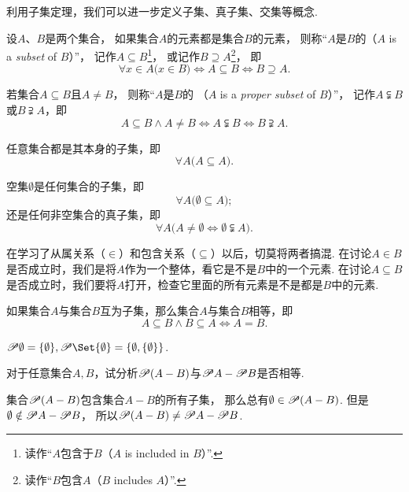 利用子集定理，我们可以进一步定义子集、真子集、交集等概念.
\begin{definition}
设\(A\)、\(B\)是两个集合，
如果集合\(A\)的元素都是集合\(B\)的元素，
则称“\(A\)是\(B\)的（\(A\) is a \emph{subset} of \(B\)）”，
记作\(A \subseteq B\)\footnote{读作“\(A\)包含于\(B\)（\(A\) is included in \(B\)）”.}，
或记作\(B \supseteq A\)\footnote{读作“\(B\)包含\(A\)（\(B\) includes \(A\)）”.}，
即\[
	\forall x \in A \bigl( x \in B \bigr)
	\iff A \subseteq B
	\iff B \supseteq A.
\]

若集合\(A \subseteq B\)且\(A \neq B\)，
则称“\(A\)是\(B\)的%
（\(A\) is a \emph{proper subset} of \(B\)）”，
记作\(A \subsetneqq B\)或\(B \supsetneqq A\)，即\[
	A \subseteq B
	\land
	A \neq B
	\iff
	A \subsetneqq B
	\iff
	B \supsetneqq A.
\]
\end{definition}

\begin{theorem}
任意集合都是其本身的子集，即\[
	\forall A \bigl( A \subseteq A \bigr).
\]
\end{theorem}

\begin{theorem}
空集\(\emptyset\)是任何集合的子集，即\[
	\forall A \bigl( \emptyset \subseteq A \bigr);
\]还是任何非空集合的真子集，即\[
	\forall A \bigl( A \neq \emptyset \iff \emptyset \subsetneqq A \bigr).
\]
\end{theorem}

在学习了从属关系（\(\in\)）和包含关系（\(\subseteq\)）以后，切莫将两者搞混.
在讨论\(A \in B\)是否成立时，我们是将\(A\)作为一个整体，看它是不是\(B\)中的一个元素.
在讨论\(A \subseteq B\)是否成立时，我们要将\(A\)打开，检查它里面的所有元素是不是都是\(B\)中的元素.

\begin{theorem}
如果集合\(A\)与集合\(B\)互为子集，那么集合\(A\)与集合\(B\)相等，即\[
	A \subseteq B \land B \subseteq A
	\iff
	A = B.
\]
\end{theorem}

\begin{example}
\(\Powerset \emptyset = \{ \emptyset \},%
\Powerset \Set{ \emptyset } = \{ \emptyset, \{ \emptyset \} \}\).
\end{example}

\begin{example}
对于任意集合\(A,B\)，试分析\(\mathscr{P}(A-B)\)与\(\mathscr{P} A - \mathscr{P} B\)是否相等.
\begin{solution}
集合\(\mathscr{P}(A-B)\)包含集合\(A-B\)的所有子集，
那么总有\(\emptyset\in\mathscr{P}(A-B)\).
但是\(\emptyset\notin\mathscr{P} A - \mathscr{P} B\)，
所以\(\mathscr{P}(A-B) \neq \mathscr{P} A - \mathscr{P} B\).
\end{solution}
\end{example}

